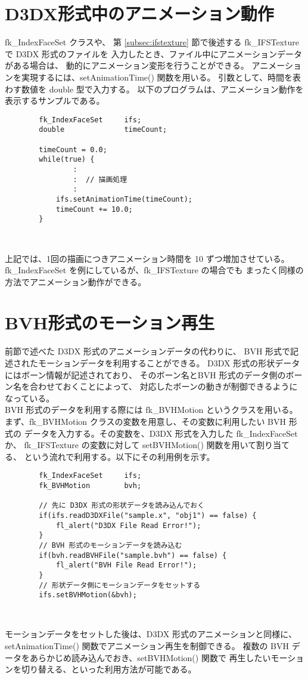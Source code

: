 \section{D3DX形式中のアニメーション動作} \label{sec:d3dxanimation}
fk\_IndexFaceSet クラスや、
第 \ref{subsec:ifstexture} 節で後述する
fk\_IFSTexture で D3DX 形式のファイルを
入力したとき、ファイル中にアニメーションデータがある場合は、
動的にアニメーション変形を行うことができる。
アニメーションを実現するには、setAnimationTime() 関数を用いる。
引数として、時間を表わす数値を double 型で入力する。
以下のプログラムは、アニメーション動作を表示するサンプルである。
\\
\begin{breakbox}
\begin{verbatim}
        fk_IndexFaceSet     ifs;
        double              timeCount;
        
        timeCount = 0.0;
        while(true) {
                :
                :  // 描画処理
                :
            ifs.setAnimationTime(timeCount);
            timeCount += 10.0;
        }
\end{verbatim}
\end{breakbox} ~

上記では、1回の描画につきアニメーション時間を 10 ずつ増加させている。
fk\_IndexFaceSet を例にしているが、fk\_IFSTexture の場合でも
まったく同様の方法でアニメーション動作ができる。

\section{BVH形式のモーション再生} \label{sec:bvhmotion}
前節で述べた D3DX 形式のアニメーションデータの代わりに、
BVH 形式で記述されたモーションデータを利用することができる。
D3DX 形式の形状データにはボーン情報が記述されており、
そのボーン名とBVH 形式のデータ側のボーン名を合わせておくことによって、
対応したボーンの動きが制御できるようになっている。
\\
BVH 形式のデータを利用する際には fk\_BVHMotion というクラスを用いる。
まず、fk\_BVHMotion クラスの変数を用意し、その変数に利用したい BVH 形式の
データを入力する。その変数を、D3DX 形式を入力した fk\_IndexFaceSet か、
fk\_IFSTexture の変数に対して setBVHMotion() 関数を用いて割り当てる、
という流れで利用する。以下にその利用例を示す。
\\
\begin{breakbox}
\begin{verbatim}
        fk_IndexFaceSet     ifs;
        fk_BVHMotion        bvh;
        
        // 先に D3DX 形式の形状データを読み込んでおく
        if(ifs.readD3DXFile("sample.x", "obj1") == false) {
            fl_alert("D3DX File Read Error!");
        }
        // BVH 形式のモーションデータを読み込む
        if(bvh.readBVHFile("sample.bvh") == false) {
            fl_alert("BVH File Read Error!");
        }
        // 形状データ側にモーションデータをセットする
        ifs.setBVHMotion(&bvh);
\end{verbatim}
\end{breakbox} ~

モーションデータをセットした後は、D3DX 形式のアニメーションと同様に、
setAnimationTime() 関数でアニメーション再生を制御できる。
複数の BVH データをあらかじめ読み込んでおき、setBVHMotion() 関数で
再生したいモーションを切り替える、といった利用方法が可能である。
